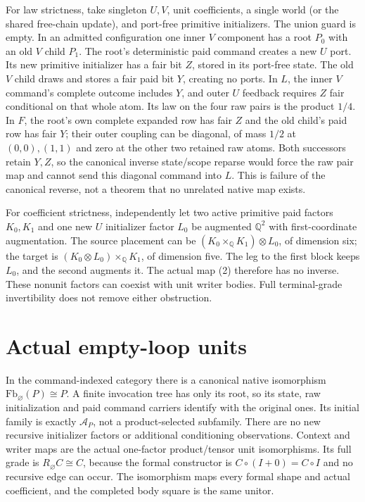 \documentclass[11pt]{article}\usepackage{amsmath,amssymb,amsthm,geometry}\geometry{margin=1in}\newtheorem{lemma}{Lemma}\newtheorem{theorem}[lemma]{Theorem}
\begin{document}
For law strictness, take singleton $U,V$, unit coefficients, a single world (or the shared free-chain update), and port-free primitive initializers. The union guard is empty. In an admitted configuration one inner $V$ component has a root $P_0$ with an old $V$ child $P_1$. The root's deterministic paid command creates a new $U$ port. Its new primitive initializer has a fair bit $Z$, stored in its port-free state. The old $V$ child draws and stores a fair paid bit $Y$, creating no ports. In $L$, the inner $V$ command's complete outcome includes $Y$, and outer $U$ feedback requires $Z$ fair conditional on that whole atom. Its law on the four raw pairs is the product $1/4$. In $F$, the root's own complete expanded row has fair $Z$ and the old child's paid row has fair $Y$; their outer coupling can be diagonal, of mass $1/2$ at $(0,0),(1,1)$ and zero at the other two retained raw atoms. Both successors retain $Y,Z$, so the canonical inverse state/scope reparse would force the raw pair map and cannot send this diagonal command into $L$. This is failure of the canonical reverse, not a theorem that no unrelated native map exists.

For coefficient strictness, independently let two active primitive paid factors $K_0,K_1$ and one new $U$ initializer factor $L_0$ be augmented $\mathbb Q^2$ with first-coordinate augmentation. The source placement can be $(K_0\times_{\mathbb Q}K_1)\otimes L_0$, of dimension six; the target is $(K_0\otimes L_0)\times_{\mathbb Q}K_1$, of dimension five. The leg to the first block keeps $L_0$, and the second augments it. The actual map (2) therefore has no inverse. These nonunit factors can coexist with unit writer bodies. Full terminal-grade invertibility does not remove either obstruction.

\section{Actual empty-loop units}
In the command-indexed category there is a canonical native isomorphism $\mathrm{Fb}_{\varnothing}(P)\cong P$. A finite invocation tree has only its root, so its state, raw initialization and paid command carriers identify with the original ones. Its initial family is exactly $\mathcal A_P$, not a product-selected subfamily. There are no new recursive initializer factors or additional conditioning observations. Context and writer maps are the actual one-factor product/tensor unit isomorphisms. Its full grade is $R_{\varnothing}C\cong C$, because the formal constructor is $C\circ(I+0)=C\circ I$ and no recursive edge can occur. The isomorphism maps every formal shape and actual coefficient, and the completed body square is the same unitor.
\end{document}
